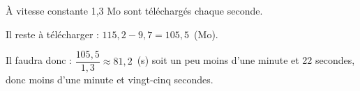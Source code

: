 
\medskip

%
À vitesse constante 1,3 Mo sont téléchargés chaque seconde.

Il reste à télécharger : $115,2 - 9,7 = 105,5$~(Mo).

Il faudra donc : $\dfrac{105,5}{1,3} \approx 81,2$~(s) soit un peu moins d'une minute et 22 secondes, donc moins d'une minute et vingt-cinq secondes.
